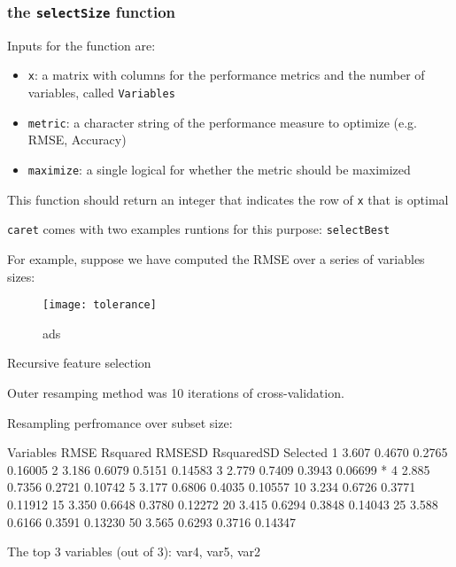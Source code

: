 \documentclass[12pt]{article}
\begin{document}
\subsubsection{the \texttt{selectSize} function}

Inputs for the function are:
\begin{itemize}
\item \texttt{x}: a matrix with columns for the performance metrics and the number of variables, called \texttt{Variables}
\item \texttt{metric}: a character string of the performance measure to optimize (e.g. RMSE, Accuracy)
\item \texttt{maximize}: a single logical for whether the metric should be maximized
\end{itemize}

This function should return an integer that indicates the row of \texttt{x} that is optimal

\texttt{caret} comes with two examples runtions for this purpose: \texttt{selectBest} 

For example, suppose we have computed the RMSE over a series of variables sizes:

\begin{figure}
   \begin{center}
      \texttt{[image: tolerance]}
      \caption{ads}      
      \label{F:all} 
    \end{center}
\end{figure}


\begin{Schunk}
\begin{Soutput}
Recursive feature selection

Outer resamping method was 10 iterations of cross-validation. 

Resampling perfromance over subset size:

 Variables  RMSE Rsquared RMSESD RsquaredSD Selected
         1 3.607   0.4670 0.2765    0.16005         
         2 3.186   0.6079 0.5151    0.14583         
         3 2.779   0.7409 0.3943    0.06699        *
         4 2.885   0.7356 0.2721    0.10742         
         5 3.177   0.6806 0.4035    0.10557         
        10 3.234   0.6726 0.3771    0.11912         
        15 3.350   0.6648 0.3780    0.12272         
        20 3.415   0.6294 0.3848    0.14043         
        25 3.588   0.6166 0.3591    0.13230         
        50 3.565   0.6293 0.3716    0.14347         

The top 3 variables (out of 3):
   var4, var5, var2
\end{Soutput}
\end{Schunk}
\end{document}
